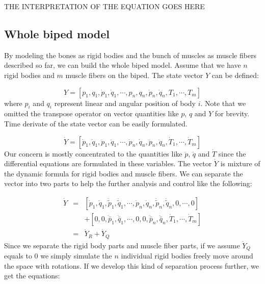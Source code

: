\documentclass[a4paper,10pt]{article}
\begin{document}
THE INTERPRETATION OF THE EQUATION GOES HERE

\subsection{Whole biped model}

By modeling the bones as rigid bodies and the bunch of muscles as muscle
fibers described so far, we can build the whole biped model. Assume that
we have $n$ rigid bodies and $m$ muscle fibers on the biped. The state vector
$Y$ can be defined:

\begin{equation}
Y = [ p_1, q_1, \dot{p}_1, \dot{q}_1, \cdots ,
      p_n, q_n, \dot{p}_n, \dot{q}_n,
      T_1, \cdots, T_m]
\end{equation}
where $p_i$ and $q_i$ represent linear and angular position of body $i$.
Note that we omitted the transpose operator on vector quantities like $p$,
$q$ and $Y$ for brevity. Time derivate of the state vector can be easily
formulated.

\begin{equation}
\dot{Y} = [ \dot{p}_1, \dot{q}_1, \ddot{p}_1, \ddot{q}_1, \cdots ,
            \dot{p}_n, \dot{q}_n, \ddot{p}_n, \ddot{q}_n,
            \dot{T}_1, \cdots, \dot{T}_m]
\end{equation}
Our concern is mostly concentrated to the quantities like $\ddot{p}$,
$\ddot{q}$ and $\dot{T}$ since the differential equations are formulated
in these variables. The vector $\dot{Y}$ is mixture
of the dynamic formula for rigid bodies and muscle fibers. We can separate
the vector into two parts to help the further analysis and control like the
following:

\begin{eqnarray*}\label{dotY1}
\dot{Y} & = & [ \dot{p}_1, \dot{q}_1, \ddot{\tilde{p}}_1, \ddot{\tilde{q}}_1, \cdots ,
                \dot{p}_n, \dot{q}_n, \ddot{\tilde{p}}_n, \ddot{\tilde{q}}_n,
                0, \cdots, 0] \\
        &   & + [ 0, 0, \ddot{\bar{p}}_1, \ddot{\bar{q}}_1, \cdots ,
                0, 0, \ddot{\bar{p}}_n, \ddot{\bar{q}}_n,
                \dot{T}_1, \cdots, \dot{T}_m]\\
        & = & \dot{Y}_R + \dot{Y}_Q
\end{eqnarray*}
Since we separate the rigid body parts and muscle fiber parts, if we
assume $\dot{Y}_Q$ equals to 0 we simply simulate the $n$ individual
rigid bodies freely move around the space with rotations. If we develop
this kind of separation process further, we get the equations:
\end{document}
